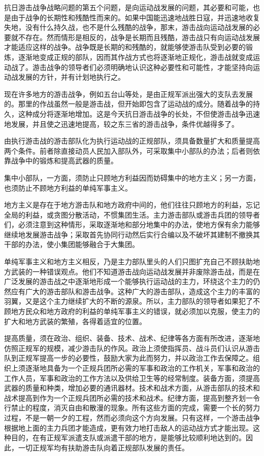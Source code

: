 抗日游击战争战略问题的第五个问题，是向运动战发展的问题，其必要和可能，也是由于战争的长期性和残酷性而来的。如果中国能迅速地战胜日寇，并迅速地收复失地，没有什么持久战，也不是什么残酷的战争，那末，游击战向运动战发展的必要就不存在。然而情形是相反的，战争是长期而且残酷，游击战只有向运动战发展才能适应这样的战争。战争既是长期的和残酷的，就能够使游击队受到必要的锻炼，逐渐地变成正规的部队，因而其作战方式也将逐渐地正规化，游击战就变成运动战了。游击战争的领导者们必须明确地认识这种必要性和可能性，才能坚持向运动战发展的方针，并有计划地执行之。

现在许多地方的游击战争，例如五台山等处，是由正规军派出强大的支队去发展的。那里的作战虽然一般是游击战，但开始即包含了运动战的成分。随着战争的持久，这种成分将逐渐地增加。这是今天抗日游击战争的长处，不但使游击战争迅速地发展，并且使之迅速地提高，较之东三省的游击战争，条件优越得多了。

由执行游击战的游击部队化为执行运动战的正规部队，须具备数量扩大和质量提高两个条件。前者除直接动员人民加入部队外，可采取集中小部队的办法；后者则依靠战争中的锻炼和提高武器的质量。

集中小部队，一方面，须防止只顾地方利益因而妨碍集中的地方主义；另一方面，也须防止不顾地方利益的单纯军事主义。

地方主义是存在于地方游击队和地方政府中间的，他们往往只顾地方的利益，忘记全局的利益，或贪图分散活动，不惯集团生活。主力游击部队或游击兵团的领导者们，必须注意到这种情形，采取逐渐地和部分地集中的办法，使地方保有余力能够继续地发展游击战争；采取首先协同行动然后实行合编以及不破坏其建制不撤换其干部的办法，使小集团能够融合于大集团。

单纯军事主义和地方主义相反，乃是主力部队里头的人们只图扩充自己不顾扶助地方武装的一种错误观点。他们不知道游击战向运动战发展并非废除游击战，而是在广泛发展的游击战之中逐渐地形成一个能够执行运动战的主力，环绕这个主力的仍然应有广大的游击部队和游击战争。这种广大的游击部队，造成这个主力的丰富的羽翼，又是这个主力继续扩大的不断的源泉。所以，主力部队的领导者如果犯了不顾地方民众和地方政府的利益的单纯军事主义的错误，就必须加以克服，使主力的扩大和地方武装的繁殖，各得着适宜的位置。

提高质量，须在政治、组织、装备、技术、战术、纪律等各方面有所改进，逐渐地仿照正规军的规模，减少游击队的作风。政治上须使指挥员、战斗员们认识从游击队到正规军提高一步的必要性，鼓励大家为此而努力，并以政治工作去保障之。组织上须逐渐地具备为一个正规兵团所必需的军事和政治的工作机关，军事和政治的工作人员，军事和政治的工作方法以及供给卫生等的经常制度。装备方面，须提高武器的质量和种类，增加必要的通讯器材。技术和战术方面，从游击部队的技术和战术提高到作为一个正规兵团所必需的技术和战术。纪律方面，提高到整齐划一令行禁止的程度，消灭自由和散漫的现象。所有这些方面的完成，需要一个长的努力过程，不是一朝一夕的工程，然而必须向这个方向发展。只有这样，一个游击战争根据地上面的主力兵团才能造成，更有效力地打击敌人的运动战方式才能出现。这种目的，在有正规军派遣支队或派遣干部的地方，是能够比较顺利地达到的。因此，一切正规军均有扶助游击队向着正规部队发展的责任。

